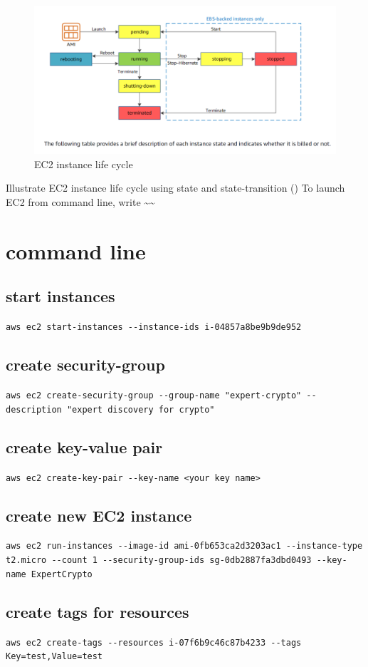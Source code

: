 \documentclass[11pt]{article}
\begin{document}
\begin{figure}[htbp]
\centering
\includegraphics[width=.9\linewidth]{./images/screenshot_20220711_141153.png}
\caption{\label{ec2_life_cycle}EC2 instance life cycle}
\end{figure}

Illustrate EC2 instance life cycle using state and state-transition ()
To launch EC2 from command line, write \textasciitilde{}\textasciitilde{}

\section{command line}
\label{sec:org4440227}
\subsection{start instances}
\label{sec:orgefa1e4d}
\texttt{aws ec2 start-instances -{}-instance-ids i-04857a8be9b9de952}
\subsection{create security-group}
\label{sec:org7450afc}
\texttt{aws ec2 create-security-group -{}-group-name "expert-crypto" -{}-description "expert discovery for crypto"}
\subsection{create key-value pair}
\label{sec:org43eebeb}
\texttt{aws ec2 create-key-pair -{}-key-name <your key name>}
\subsection{create new EC2 instance}
\label{sec:org55f8bbc}
\texttt{aws ec2 run-instances -{}-image-id ami-0fb653ca2d3203ac1 -{}-instance-type t2.micro -{}-count 1 -{}-security-group-ids sg-0db2887fa3dbd0493 -{}-key-name ExpertCrypto}
\subsection{create tags for resources}
\label{sec:org7e732fc}
\texttt{aws ec2 create-tags -{}-resources i-07f6b9c46c87b4233 -{}-tags Key=test,Value=test}
\end{document}
